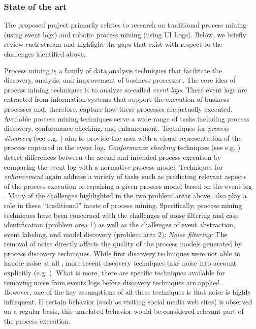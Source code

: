  
\subsubsection{State of the art} 
 \label{sec:stateoftheart}
 
The proposed project primarily relates to research on traditional process mining (using event logs) and robotic process mining (using UI Logs). Below, we briefly review each stream and highlight the gaps that exist with respect to the challenges identified above.  

 Process mining is a family of data analysis techniques that facilitate the discovery, analysis, and improvement of business processes \cite{van2016data}. The core idea of process mining techniques is to analyze so-called \textit{event logs}. These event logs are extracted from information systems that support the execution of business processes and, therefore, capture how these processes are actually executed. Available process mining techniques serve a wide range of tasks including process discovery, conformance checking, and enhancement. Techniques for \textit{process discovery} (see e.g. \cite{gunther2007fuzzy,weijters2011flexible,leemans2013discovering}) aim to provide the user with a visual representation of the process captured in the event log. \textit{Conformance checking} techniques (see e.g. \cite{rozinat2008conformance,adriansyah2011conformance}) detect differences between the actual and intended process execution by comparing the event log with a normative process model. Techniques for \textit{enhancement} again address a variety of tasks such as predicting relevant aspects of the process execution \cite{di2018predictive} or repairing a given process model based on the event log \cite{polyvyanyy2016impact}. Many of the challenges highlighted in the two problem areas above, also play a role in these ``traditional'' facets of process mining. Specifically, process mining techniques have been concerned with the challenges of noise filtering and case identification (problem area 1) as well as the challenges of event abstraction, event labeling, and model discovery (problem area 2):
\vspace{0.2em}
\newline%
\noindent \textit{Noise filtering:} The removal of noise directly affects the quality of the process models generated by process discovery techniques. While first discovery techniques were not able to handle noise at all \cite{van2004workflow}, more recent discovery techniques take noise into account explicitly (e.g. \cite{weijters2003rediscovering,leemans2013discovering,van2016avoiding}). What is more, there are specific techniques available for removing noise from events logs before discovery techniques are applied \cite{tax2017discovering,CHENG2015138}. However, one of the key assumptions of all these techniques is that noise is highly infrequent. If certain behavior (such as visiting social media web sites) is observed on a regular basis, this unrelated behavior would be considered relevant part of the process execution. 
